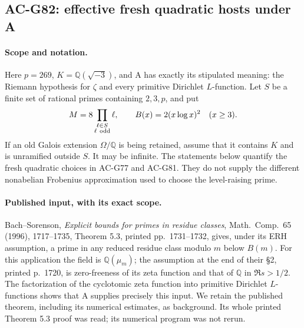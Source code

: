 \subsection{AC-G82: effective fresh quadratic hosts under A}
\label{sec:cubic-effective-fresh-host}
\paragraph{Scope and notation.}
Here \(p=269\), \(K=\mathbb Q(\sqrt{-3})\), and A has exactly its stipulated meaning: the Riemann hypothesis for \(\zeta\) and every primitive Dirichlet \(L\)-function. Let \(S\) be a finite set of rational primes containing \(2,3,p\), and put
\[
 M=8\prod_{\substack{\ell\in S\\\ell\ {\rm odd}}}\ell,\qquad
 B(x)=2(x\log x)^2\quad(x\geq3).
\]
If an old Galois extension \(\Omega/\mathbb Q\) is being retained, assume that it contains \(K\) and is unramified outside \(S\). It may be infinite. The statements below quantify the fresh quadratic choices in AC-G77 and AC-G81. They do not supply the different nonabelian Frobenius approximation used to choose the level-raising prime.

\paragraph{Published input, with its exact scope.}
Bach--Sorenson, \emph{Explicit bounds for primes in residue classes}, Math.\ Comp.\ 65 (1996), 1717--1735, Theorem 5.3, printed pp.\ 1731--1732, gives, under its ERH assumption, a prime in any reduced residue class modulo \(m\) below \(B(m)\). For this application the field is \(\mathbb Q(\mu_m)\); the assumption at the end of their \S2, printed p.\ 1720, is zero-freeness of its zeta function and that of \(\mathbb Q\) in \(\Re s>1/2\). The factorization of the cyclotomic zeta function into primitive Dirichlet \(L\)-functions shows that A supplies precisely this input. We retain the published theorem, including its numerical estimates, as background. Its whole printed Theorem 5.3 proof was read; its numerical program was not rerun.

